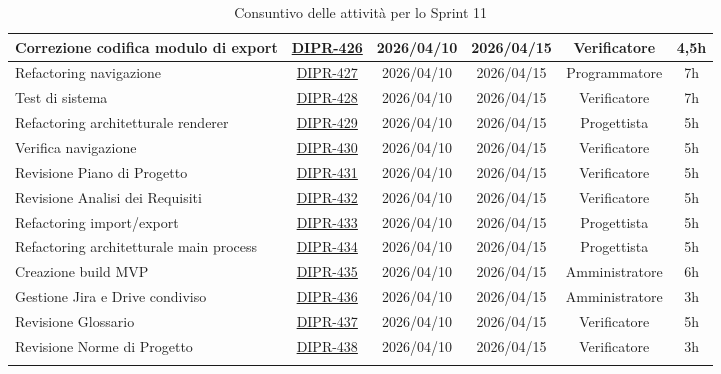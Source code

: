 \documentclass[a4paper,12pt]{article}
\begin{document}
\begin{spacing}{1}
\begin{longtable}{|p{4cm}|c|c|c|c|c|}
        Correzione codifica modulo di export & \href{https://7zpus.atlassian.net/browse/DIPR-426}{DIPR-426} & 2026/04/10 & 2026/04/15 & Verificatore & 4,5h \\
        \hline
        Refactoring navigazione & \href{https://7zpus.atlassian.net/browse/DIPR-427}{DIPR-427} & 2026/04/10 & 2026/04/15 & Programmatore & 7h \\
        \hline
        Test di sistema & \href{https://7zpus.atlassian.net/browse/DIPR-428}{DIPR-428} & 2026/04/10 & 2026/04/15 & Verificatore & 7h \\
        \hline
        Refactoring architetturale renderer & \href{https://7zpus.atlassian.net/browse/DIPR-429}{DIPR-429} & 2026/04/10 & 2026/04/15 & Progettista & 5h \\
        \hline
        Verifica navigazione & \href{https://7zpus.atlassian.net/browse/DIPR-430}{DIPR-430} & 2026/04/10 & 2026/04/15 & Verificatore & 5h \\
        \hline
        Revisione Piano di Progetto & \href{https://7zpus.atlassian.net/browse/DIPR-431}{DIPR-431} & 2026/04/10 & 2026/04/15 & Verificatore & 5h \\
        \hline
        Revisione Analisi dei Requisiti & \href{https://7zpus.atlassian.net/browse/DIPR-432}{DIPR-432} & 2026/04/10 & 2026/04/15 & Verificatore & 5h \\
        \hline
        Refactoring import/export & \href{https://7zpus.atlassian.net/browse/DIPR-433}{DIPR-433} & 2026/04/10 & 2026/04/15 & Progettista & 5h \\
        \hline
        Refactoring architetturale main process & \href{https://7zpus.atlassian.net/browse/DIPR-434}{DIPR-434} & 2026/04/10 & 2026/04/15 & Progettista & 5h \\
        \hline
        Creazione build MVP & \href{https://7zpus.atlassian.net/browse/DIPR-435}{DIPR-435} & 2026/04/10 & 2026/04/15 & Amministratore & 6h \\
        \hline
        Gestione Jira e Drive condiviso & \href{https://7zpus.atlassian.net/browse/DIPR-436}{DIPR-436} & 2026/04/10 & 2026/04/15 & Amministratore & 3h \\
        \hline
        Revisione Glossario & \href{https://7zpus.atlassian.net/browse/DIPR-437}{DIPR-437} & 2026/04/10 & 2026/04/15 & Verificatore & 5h \\
        \hline
        Revisione Norme di Progetto & \href{https://7zpus.atlassian.net/browse/DIPR-438}{DIPR-438} & 2026/04/10 & 2026/04/15 & Verificatore & 3h \\
        \hline
        \rowcolor{white}
        \caption{Consuntivo delle attività per lo Sprint 11}
    \end{longtable}
    \end{spacing}
\end{document}

